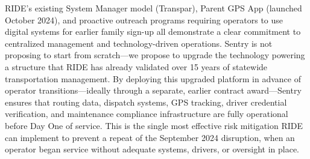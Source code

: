 \begin{description}[style=nextline, leftmargin=0.5cm]
    \item[\faIcon{check-circle} \textbf{Building on What Works:}] RIDE's existing System Manager model (Transpar), Parent GPS App (launched October 2024), and proactive outreach programs requiring operators to use digital systems for earlier family sign-up all demonstrate a clear commitment to centralized management and technology-driven operations. Sentry is not proposing to start from scratch---we propose to upgrade the technology powering a structure that RIDE has already validated over 15 years of statewide transportation management. By deploying this upgraded platform in advance of operator transitions---ideally through a separate, earlier contract award---Sentry ensures that routing data, dispatch systems, GPS tracking, driver credential verification, and maintenance compliance infrastructure are fully operational before Day One of service. This is the single most effective risk mitigation RIDE can implement to prevent a repeat of the September 2024 disruption, when an operator began service without adequate systems, drivers, or oversight in place.
\end{description}

\vspace{0.5cm}

